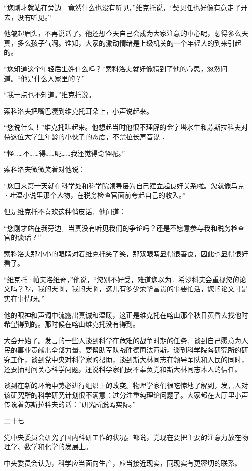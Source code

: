 “您刚才就站在旁边，竟然什么也没有听见，”维克托说，“契贝任也好像有意走了开去，没有听见。”

他皱起眉头，不再说话了。他还想今天自己会成为大家注意的中心呢，想得多么天真，多么孩子气啊。谁知，大家的激动情绪是上级机关的一个年轻人的到来引起的。

“您知道这个年轻后生姓什么吗？”索科洛夫就好像猜到了他的心思，忽然问道。“他是什么人家里的？”

“我一点也不知道。”维克托说。

索科洛夫把嘴巴凑到维克托耳朵上，小声说起来。

“您说什么！”维克托叫起来。他想起当时他很不理解的金字塔水牛和苏斯拉科夫对待这位大学生年龄的小伙子的态度，不禁拉长声音说：

“怪……不……得……呢……我还觉得奇怪呢。”

索科洛夫微微笑着对他说：

“您回来第一天就在科学处和科学院领导层为自己建立起良好关系啦。您就像马克·吐温小说里那个人物，在税务检查官面前夸起自己的收入。”

但是维克托不喜欢这种俏皮话，他问道：

“您刚才站在我旁边，当真没有听见我们的争论吗？还是不愿意参与我和税务检查官的谈话？”

索科洛夫那小小的眼睛对着维克托笑了笑，那双眼睛显得很善良，因此也显得很好看了。

“维克托·帕夫洛维奇，”他说，“您别不好受，难道您以为，希沙科夫会重视您的论文吗？哼，我的天啊，我的天啊，这儿有多少荣华富贵的事要忙活，您的论文可是实在事情呀。”

他的眼神和声调中流露出真诚和温暖，这正是维克托在喀山那个秋日黄昏去找他时希望得到的。那时候在喀山维克托没有得到。

大会开始了。发言的一些人谈到科学在危难的战争时期的任务，谈到自己愿意为人民的事业贡献出全部力量，要帮助军队战胜德国法西斯。谈到科学院各研究所的研究工作，谈到党中央对科学家的帮助，谈到斯大林同志在领导军队和人民的同时，还要抽时间关心科学问题，还说科学家们要不辜负党和斯大林同志本人的信任。

谈到在新的环境中势必进行组织上的改变。物理学家们很吃惊地了解到，发言人对该研究所的科学研究计划很不满意：过分注重纯理论问题了。大家都在大厅里小声传说着苏斯拉科夫的话：“研究所脱离实际。”

二十七

党中央委员会研究了国内科研工作的状况。都说，党现在要把主要的注意力放在物理学、数学和化学的发展上。

中央委员会认为，科学应当面向生产，应当接近现实，同现实有更密切的联系。

